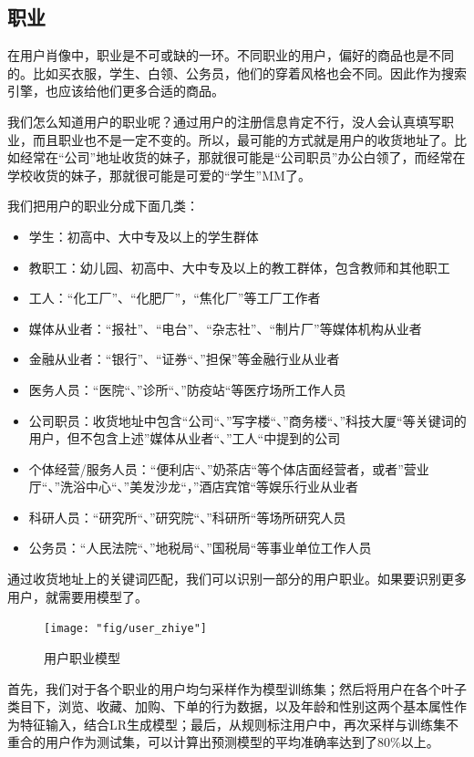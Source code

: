 	\subsection{职业}
	
	在用户肖像中，职业是不可或缺的一环。不同职业的用户，偏好的商品也是不同的。比如买衣服，学生、白领、公务员，他们的穿着风格也会不同。因此作为搜索引擎，也应该给他们更多合适的商品。
	
	我们怎么知道用户的职业呢？通过用户的注册信息肯定不行，没人会认真填写职业，而且职业也不是一定不变的。所以，最可能的方式就是用户的收货地址了。比如经常在“公司”地址收货的妹子，那就很可能是“公司职员”办公白领了，而经常在学校收货的妹子，那就很可能是可爱的“学生”MM了。
	
	我们把用户的职业分成下面几类：
	
	\begin{itemize}
	\item{学生：初高中、大中专及以上的学生群体}
	\item{教职工：幼儿园、初高中、大中专及以上的教工群体，包含教师和其他职工}
	\item{工人：“化工厂”、“化肥厂”，“焦化厂”等工厂工作者}
	\item{媒体从业者：“报社”、“电台”、“杂志社”、“制片厂”等媒体机构从业者}
	\item{金融从业者：“银行”、“证券“、”担保”等金融行业从业者}
	\item{医务人员：“医院“、”诊所“、”防疫站“等医疗场所工作人员}
	\item{公司职员：收货地址中包含“公司“、”写字楼“、”商务楼“、”科技大厦“等关键词的用户，但不包含上述”媒体从业者“、”工人“中提到的公司}
	\item{个体经营/服务人员：“便利店“、”奶茶店“等个体店面经营者，或者”营业厅“、”洗浴中心“、”美发沙龙“，”酒店宾馆“等娱乐行业从业者}
	\item{科研人员：“研究所“、”研究院“、”科研所“等场所研究人员}
	\item{公务员：“人民法院“、”地税局“、”国税局“等事业单位工作人员}
	\end{itemize}

	通过收货地址上的关键词匹配，我们可以识别一部分的用户职业。如果要识别更多用户，就需要用模型了。
	
	\begin{figure}[h]
		\centering
		\texttt{[image: "fig/user\_zhiye"]}
		\caption{用户职业模型}
		\label{fig:user_zhiye}
	\end{figure}

	首先，我们对于各个职业的用户均匀采样作为模型训练集；然后将用户在各个叶子类目下，浏览、收藏、加购、下单的行为数据，以及年龄和性别这两个基本属性作为特征输入，结合LR生成模型；最后，从规则标注用户中，再次采样与训练集不重合的用户作为测试集，可以计算出预测模型的平均准确率达到了80\%以上。
	
